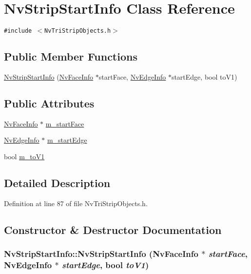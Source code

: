 \hypertarget{class_nv_strip_start_info}{
\section{NvStripStartInfo Class Reference}
\label{class_nv_strip_start_info}
}
{\tt \#include $<$NvTriStripObjects.h$>$}

\subsection*{Public Member Functions}
\begin{CompactItemize}
\item 
\hyperlink{class_nv_strip_start_info_886d5a4a7e6d28dcade22d29023ae9e8}{NvStripStartInfo} (\hyperlink{class_nv_face_info}{NvFaceInfo} $\ast$startFace, \hyperlink{class_nv_edge_info}{NvEdgeInfo} $\ast$startEdge, bool toV1)
\end{CompactItemize}
\subsection*{Public Attributes}
\begin{CompactItemize}
\item 
\hyperlink{class_nv_face_info}{NvFaceInfo} $\ast$ \hyperlink{class_nv_strip_start_info_f25b559930abc57ccaff9e726d2b21c9}{m\_\-startFace}
\item 
\hyperlink{class_nv_edge_info}{NvEdgeInfo} $\ast$ \hyperlink{class_nv_strip_start_info_79992beb7f2b518f57db8cc9460ff696}{m\_\-startEdge}
\item 
bool \hyperlink{class_nv_strip_start_info_c784b08380d565a14a7290832dfc3af3}{m\_\-toV1}
\end{CompactItemize}


\subsection{Detailed Description}


Definition at line 87 of file NvTriStripObjects.h.

\subsection{Constructor \& Destructor Documentation}
\hypertarget{class_nv_strip_start_info_886d5a4a7e6d28dcade22d29023ae9e8}{
\subsubsection[{NvStripStartInfo}]{\setlength{\rightskip}{0pt plus 5cm}NvStripStartInfo::NvStripStartInfo ({\bf NvFaceInfo} $\ast$ {\em startFace}, \/  {\bf NvEdgeInfo} $\ast$ {\em startEdge}, \/  bool {\em toV1})}}
\label{class_nv_strip_start_info_886d5a4a7e6d28dcade22d29023ae9e8}





